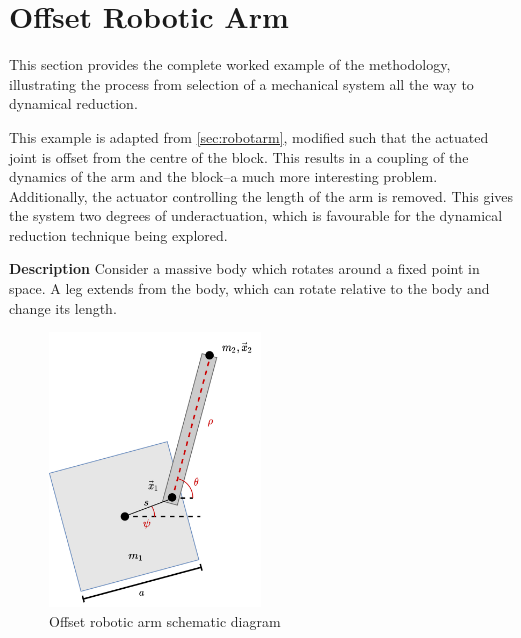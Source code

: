 \documentclass[main.tex]{subfiles}
\begin{document}
\section{Offset Robotic Arm}\label{sec:robotarmoffset} 
This section provides the complete worked example of the methodology, illustrating the process from selection of a mechanical system all the way to dynamical reduction. 

This example is adapted from \ref{sec:robotarm}, modified such that the actuated joint is offset from the centre of the block. This results in a coupling of the dynamics of the arm and the block--a much more interesting problem. Additionally, the actuator controlling the length of the arm is removed. This gives the system two degrees of underactuation, which is favourable for the dynamical reduction technique being explored.

\textbf{Description} Consider a massive body which rotates around a fixed point in space. A leg extends from the body, which can rotate relative to the body and change its length.
\begin{figure}[h]
    \centering
    \includegraphics[width=0.5\textwidth]{assets/robot-arm.png}
    \caption{Offset robotic arm schematic diagram}
    \label{fig:rob-arm}
\end{figure}
\end{document}
